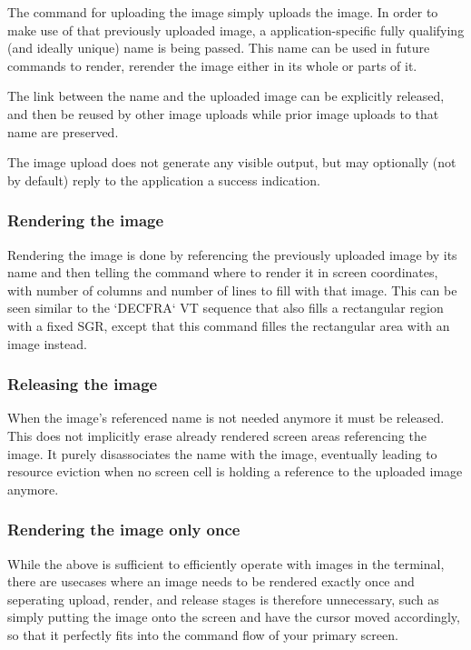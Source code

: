 \documentclass[a4paper]{article}
\begin{document}
The command for uploading the image simply uploads the image.
In order to make use of that previously uploaded image, a application-specific
fully qualifying (and ideally unique) name is being passed.
This name can be used in future commands to render, rerender the image
either in its whole or parts of it.

The link between the name and the uploaded image can be explicitly released,
and then be reused by other image uploads while prior image uploads to that
name are preserved.

The image upload does not generate any visible output, but may optionally
(not by default) reply to the application a success indication.

\subsubsection*{Rendering the image} %

Rendering the image is done by referencing the previously uploaded
image by its name and then telling the command where to render it
in screen coordinates, with number of columns and number of lines to fill
with that image. This can be seen similar to the `DECFRA` VT sequence
that also fills a rectangular region with a fixed SGR, except
that this command filles the rectangular area with an image instead.

\subsubsection*{Releasing the image} %

When the image's referenced name is not needed anymore it must be released.
This does not implicitly erase already rendered screen areas referencing the image.
It purely disassociates the name with the image, eventually leading
to resource eviction when no screen cell is holding a reference to the
uploaded image anymore.

\subsubsection*{Rendering the image only once} %

While the above is sufficient to efficiently operate with images in the terminal,
there are usecases where an image needs to be rendered exactly once and
seperating upload, render, and release stages is therefore unnecessary,
such as simply putting the image onto the screen and have the cursor moved
accordingly, so that it perfectly fits into the command flow of your primary screen.
\end{document}
